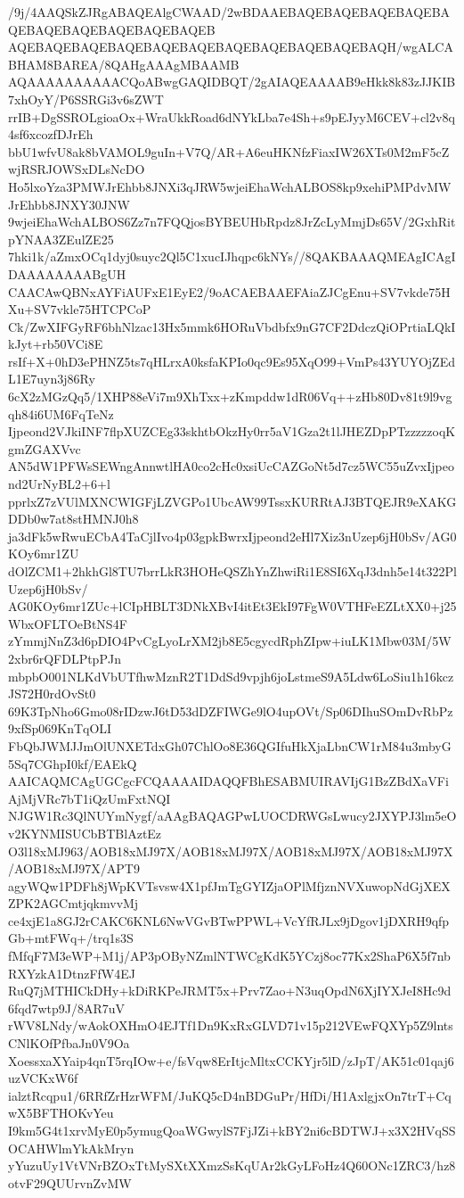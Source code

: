 /9j/4AAQSkZJRgABAQEAlgCWAAD/2wBDAAEBAQEBAQEBAQEBAQEBAQEBAQEBAQEBAQEBAQEBAQEB
AQEBAQEBAQEBAQEBAQEBAQEBAQEBAQEBAQEBAQEBAQH/wgALCABHAM8BAREA/8QAHgAAAgMBAAMB
AQAAAAAAAAAACQoABwgGAQIDBQT/2gAIAQEAAAAB9eHkk8k83zJJKIB7xhOyY/P6SSRGi3v6sZWT
rrIB+DgSSROLgioaOx+WraUkkRoad6dNYkLba7e4Sh+s9pEJyyM6CEV+cl2v8q4sf6xcozfDJrEh
bbU1wfvU8ak8bVAMOL9guIn+V7Q/AR+A6euHKNfzFiaxIW26XTs0M2mF5cZwjRSRJOWSxDLsNcDO
Ho5lxoYza3PMWJrEhbb8JNXi3qJRW5wjeiEhaWchALBOS8kp9xehiPMPdvMWJrEhbb8JNXY30JNW
9wjeiEhaWchALBOS6Zz7n7FQQjosBYBEUHbRpdz8JrZcLyMmjDs65V/2GxhRitpYNAA3ZEulZE25
7hki1k/aZmxOCq1dyj0suyc2Ql5C1xucIJhqpc6kNYs//8QAKBAAAQMEAgICAgIDAAAAAAAABgUH
CAACAwQBNxAYFiAUFxE1EyE2/9oACAEBAAEFAiaZJCgEnu+SV7vkde75HXu+SV7vkle75HTCPCoP
Ck/ZwXIFGyRF6bhNlzac13Hx5mmk6HORuVbdbfx9nG7CF2DdczQiOPrtiaLQkIkJyt+rb50VCi8E
rsIf+X+0hD3ePHNZ5ts7qHLrxA0ksfaKPIo0qc9Es95XqO99+VmPs43YUYOjZEdL1E7uyn3j86Ry
6cX2zMGzQq5/1XHP88eVi7m9XhTxx+zKmpddw1dR06Vq++zHb80Dv81t9l9vgqh84i6UM6FqTeNz
Ijpeond2VJkiINF7flpXUZCEg33skhtbOkzHy0rr5aV1Gza2t1lJHEZDpPTzzzzzoqKgmZGAXVvc
AN5dW1PFWsSEWngAnnwtlHA0co2cHc0xsiUcCAZGoNt5d7cz5WC55uZvxIjpeond2UrNyBL2+6+l
pprlxZ7zVUlMXNCWIGFjLZVGPo1UbcAW99TssxKURRtAJ3BTQEJR9eXAKGDDb0w7at8stHMNJ0h8
ja3dFk5wRwuECbA4TaCjlIvo4p03gpkBwrxIjpeond2eHl7Xiz3nUzep6jH0bSv/AG0KOy6mr1ZU
dOlZCM1+2hkhGl8TU7brrLkR3HOHeQSZhYnZhwiRi1E8SI6XqJ3dnh5e14t322PlUzep6jH0bSv/
AG0KOy6mr1ZUc+lCIpHBLT3DNkXBvI4itEt3EkI97FgW0VTHFeEZLtXX0+j25WbxOFLTOeBtNS4F
zYmmjNnZ3d6pDIO4PvCgLyoLrXM2jb8E5cgycdRphZIpw+iuLK1Mbw03M/5W2xbr6rQFDLPtpPJn
mbpbO001NLKdVbUTfhwMznR2T1DdSd9vpjh6joLstmeS9A5Ldw6LoSiu1h16kczJS72H0rdOvSt0
69K3TpNho6Gmo08rIDzwJ6tD53dDZFIWGe9lO4upOVt/Sp06DIhuSOmDvRbPz9xfSp069KnTqOLI
FbQbJWMJJmOlUNXETdxGh07ChlOo8E36QGIfuHkXjaLbnCW1rM84u3mbyG5Sq7CGhpI0kf/EAEkQ
AAICAQMCAgUGCgcFCQAAAAIDAQQFBhESABMUIRAVIjG1BzZBdXaVFiAjMjVRc7bT1iQzUmFxtNQI
NJGW1Rc3QlNUYmNygf/aAAgBAQAGPwLUOCDRWGsLwucy2JXYPJ3lm5eOv2KYNMISUCbBTBlAztEz
O3l18xMJ963/AOB18xMJ97X/AOB18xMJ97X/AOB18xMJ97X/AOB18xMJ97X/AOB18xMJ97X/APT9
agyWQw1PDFh8jWpKVTsvsw4X1pfJmTgGYIZjaOPlMfjznNVXuwopNdGjXEXZPK2AGCmtjqkmvvMj
ce4xjE1a8GJ2rCAKC6KNL6NwVGvBTwPPWL+VcYfRJLx9jDgov1jDXRH9qfpGb+mtFWq+/trq1s3S
fMfqF7M3eWP+M1j/AP3pOByNZmlNTWCgKdK5YCzj8oc77Kx2ShaP6X5f7nbRXYzkA1DtnzFfW4EJ
RuQ7jMTHICkDHy+kDiRKPeJRMT5x+Prv7Zao+N3uqOpdN6XjIYXJeI8Hc9d6fqd7wtp9J/8AR7uV
rWV8LNdy/wAokOXHmO4EJTf1Dn9KxRxGLVD71v15p212VEwFQXYp5Z9lntsCNlKOfPfbaJn0V9Oa
XoessxaXYaip4qnT5rqIOw+e/fsVqw8ErItjcMltxCCKYjr5lD/zJpT/AK51c01qaj6uzVCKxW6f
ialztRcqpu1/6RRfZrHzrWFM/JuKQ5cD4nBDGuPr/HfDi/H1AxlgjxOn7trT+CqwX5BFTHOKvYeu
I9km5G4t1xrvMyE0p5ymugQoaWGwylS7FjJZi+kBY2ni6cBDTWJ+x3X2HVqSSOCAHWlmYkAkMryn
yYuzuUy1VtVNrBZOxTtMySXtXXmzSsKqUAr2kGyLFoHz4Q60ONc1ZRC3/hz8otvF29QUUrvnZvMW
